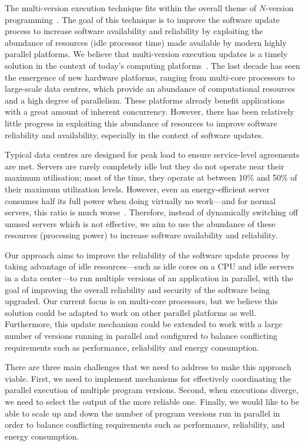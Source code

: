 The multi-version execution technique fits within the overall theme of
$N$-version programming~\cite{avizienis:nvp,chen1995}. The goal of this
technique is to improve the software update process to increase software
availability and reliability by exploiting the abundance of resources (\eg idle
processor time) made available by modern highly parallel platforms.  We believe
that multi-version execution updates is a timely solution in the context of
today's computing platforms~\cite{multiplicity}. The last decade has seen the
emergence of new hardware platforms, ranging from multi-core processors to
large-scale data centres, which provide an abundance of computational resources
and a high degree of parallelism. These platforms already benefit applications
with a great amount of inherent concurrency.  However, there has been
relatively little progress in exploiting this abundance of resources to improve
software reliability and availability, especially in the context of software
updates.

Typical data centres are designed for peak load to ensure service-level
agreements are met. Servers are rarely completely idle but they do not operate
near their maximum utilisation; most of the time, they operate at between 10\%
and 50\% of their maximum utilization levels. However, even an energy-efficient
server consumes half its full power when doing virtually no work---and for
normal servers, this ratio is much worse~\cite{barroso2007}.  Therefore,
instead of dynamically switching off unused servers which is not effective, we
aim to use the abundance of these resources (\ie processing power) to increase
software availability and reliability.

Our approach aims to improve the reliability of the software update process by
taking advantage of idle resources---such as idle cores on a CPU and idle
servers in a data center---to run multiple versions of an application in
parallel, with the goal of improving the overall reliability and security of
the software being upgraded.  Our current focus is on multi-core processors,
but we believe this solution could be adapted to work on other parallel
platforms as well.  Furthermore, this update mechanism could be extended to
work with a large number of versions running in parallel and configured to
balance conflicting requirements such as performance, reliability and energy
consumption.

There are three main challenges that we need to address to make this approach
viable. First, we need to implement mechanisms for effectively coordinating the
parallel execution of multiple program versions.  Second, when executions
diverge, we need to select the output of the more reliable one.  Finally, we
would like to be able to scale up and down the number of program versions run
in parallel in order to balance conflicting requirements such as performance,
reliability, and energy consumption.

